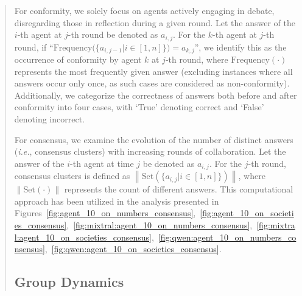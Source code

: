 \documentclass[11pt]{article}
\newcommand{\ie}{\hbox{\emph{i.e.}}\xspace}
\begin{document}
\begin{abstract}
For conformity, we solely focus on agents actively engaging in debate, disregarding those in reflection during a given round. 
Let the answer of the $i$-th agent at $j$-th round be denoted as $a_{i,j}$. 
For the $k$-th agent at $j$-th round, if ``$\text{Frequency}\big( \{a_{i,j-1} | i \in [1,n]\}\big)=a_{k,j}$'', we identify this as the occurrence of conformity by agent $k$ at $j$-th round, where $\text{Frequency}(\cdot)$ represents the most frequently given answer (excluding instances where all answers occur only once, as such cases are considered as non-conformity). 
Additionally, we categorize the correctness of answers both before and after conformity into four cases, with `True' denoting correct and `False' denoting incorrect.

For consensus, we examine the evolution of the number of distinct answers (\ie, consensus clusters) with increasing rounds of collaboration. Let the answer of the $i$-th agent at time $j$ be denoted as $a_{i,j}$. 
For the $j$-th round, consensus clusters is defined as $\left \|\text{Set}(\{a_{i,j}|i\in[1,n]\})\right \| $, where $\left \|\text{Set}(\cdot)\right \|$ represents the count of different answers. 
This computational approach has been utilized in the analysis presented in Figures~\ref{fig:agent_10_on_numbers_consensus},~\ref{fig:agent_10_on_societies_consensus},~\ref{fig:mixtral:agent_10_on_numbers_consensus},~\ref{fig:mixtral:agent_10_on_societies_consensus},~\ref{fig:qwen:agent_10_on_numbers_consensus},~\ref{fig:qwen:agent_10_on_societies_consensus}. 

\subsection{Group Dynamics} %
\label{app:principles_group_dynamics}


\end{abstract}
\end{document}
